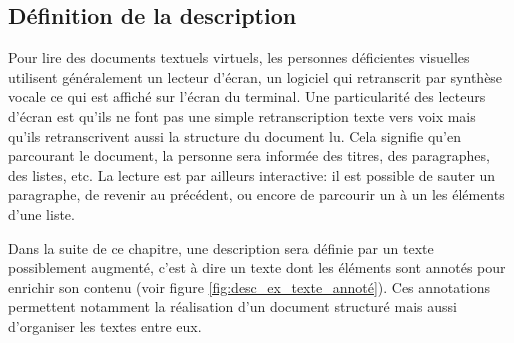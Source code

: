 \subsection{Définition de la description}

Pour lire des documents textuels virtuels, les personnes déficientes visuelles utilisent généralement un lecteur d’écran, un logiciel qui retranscrit par synthèse vocale ce qui est affiché sur l’écran du terminal. Une particularité des lecteurs d’écran est qu’ils ne font pas une simple retranscription texte vers voix mais qu’ils retranscrivent aussi la structure du document lu. Cela signifie qu’en parcourant le document, la personne sera informée des titres, des paragraphes, des listes, etc. La lecture est par ailleurs interactive: il est possible de sauter un paragraphe, de revenir au précédent, ou encore de parcourir un à un les éléments d’une liste.

\newpar{}

Dans la suite de ce chapitre, une description sera définie par un texte possiblement augmenté, c’est à dire un texte dont les éléments sont annotés pour enrichir son contenu \citep{oren2006semantic} (voir figure \ref{fig:desc_ex_texte_annoté}). Ces annotations permettent notamment la réalisation d’un document structuré mais aussi d’organiser les textes entre eux.

